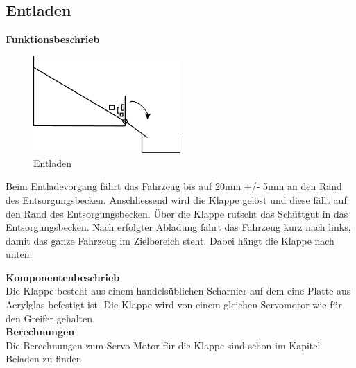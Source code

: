 \subsection{Entladen}

\textbf{Funktionsbeschrieb}\\[0.2cm]
\begin{figure}[H]
\centering
\includegraphics[width=0.5\textwidth]{03_Loesungskonzept/pictures/Entladen_Schraegbehaelter.png}
\caption{Entladen}
\end{figure}

Beim Entladevorgang fährt das Fahrzeug bis auf 20mm +/- 5mm an den Rand des Entsorgungsbecken. Anschliessend wird die Klappe gelöst und diese fällt auf den Rand des Entsorgungsbecken. Über die Klappe rutscht das Schüttgut in das Entsorgungsbecken. Nach erfolgter Abladung fährt das Fahrzeug kurz nach links, damit das ganze Fahrzeug im Zielbereich steht. Dabei hängt die Klappe nach unten.

\textbf{Komponentenbeschrieb}\\[0.2cm]
Die Klappe besteht aus einem handelsüblichen Scharnier auf dem eine Platte aus Acrylglas befestigt ist.
Die Klappe wird von einem gleichen Servomotor wie für den Greifer gehalten.\\

\textbf{Berechnungen}\\[0.2cm]
Die Berechnungen zum Servo Motor für die Klappe sind schon im Kapitel Beladen zu finden. 